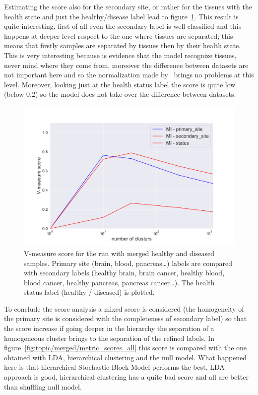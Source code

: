 Estimating the score also for the secondary site, or rather for the tissues with the health state and just the healthy/disease label lead to figure~\ref{fig:topic/merged/metric_scores}. This result is quite interesting, first of all even the secondary label is well classified and this happens at deeper level respect to the one where tissues are separated; this means that firstly samples are separated by tissues then by their health state. This is very interesting because is evidence that the model recognize tissues, never mind where they come from, moreover the difference between datasets are not important here and so the normalization made by~\cite{Betel2018} brings no problems at this level. Moreover, looking just at the health status label the score is quite low (below $0.2$) so the model does not take over the difference between datasets.
\begin{figure}[htb!]
    \centering
    \includegraphics[width=0.8\linewidth]{pictures/topic/merged/metric_scores.pdf}
    \caption{V-measure score for the run with merged healthy and diseased samples. Primary site (brain, blood, pancreas\ldots) labels are compared with secondary labels (healthy brain, brain cancer, healthy blood, blood cancer, healthy pancreas, pancreas cancer\ldots). The health status label (healthy / diseased) is plotted.}
    \label{fig:topic/merged/metric_scores}
\end{figure}
To conclude the score analysis a mixed score is considered (the homogeneity of the primary site is considered with the completeness of secondary label) so that the score increase if going deeper in the hierarchy the separation of a homogeneous cluster brings to the separation of the refined labels. In figure~\ref{fig:topic/merged/metric_scores_all} this score is compared with the one obtained with LDA, hierarchical clustering and the null model. What happened here is that hierarchical Stochastic Block Model performs the best, LDA approach is good, hierarchical clustering has a quite bad score and all are better than shuffling null model.
